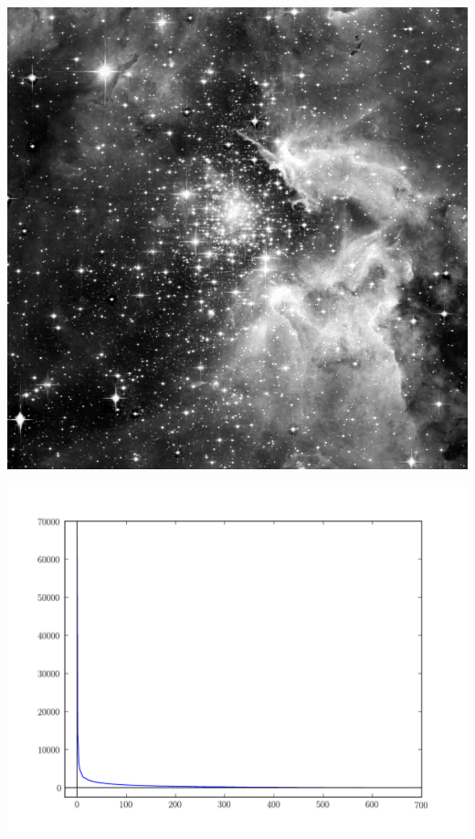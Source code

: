\begin{center}
\includegraphics[scale=.2]{hubble_red.png}

\includegraphics[scale=.4]{hubble_svals.pdf}
\end{center}

